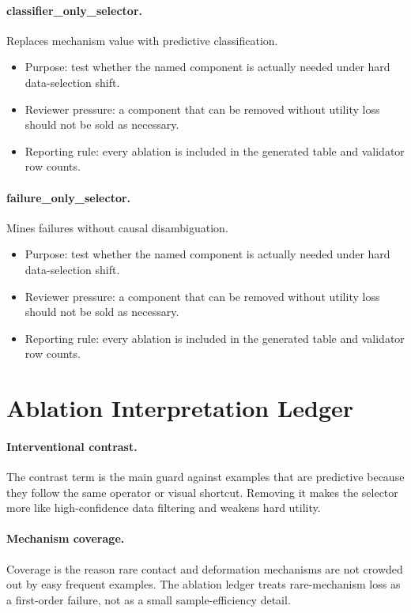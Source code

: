 \documentclass{article}
\begin{document}
\paragraph{classifier\_only\_selector.} Replaces mechanism value with predictive classification.
\begin{itemize}
\item Purpose: test whether the named component is actually needed under hard data-selection shift.
\item Reviewer pressure: a component that can be removed without utility loss should not be sold as necessary.
\item Reporting rule: every ablation is included in the generated table and validator row counts.
\end{itemize}
\paragraph{failure\_only\_selector.} Mines failures without causal disambiguation.
\begin{itemize}
\item Purpose: test whether the named component is actually needed under hard data-selection shift.
\item Reviewer pressure: a component that can be removed without utility loss should not be sold as necessary.
\item Reporting rule: every ablation is included in the generated table and validator row counts.
\end{itemize}
\section{Ablation Interpretation Ledger}
\paragraph{Interventional contrast.} The contrast term is the main guard against examples that are predictive because they follow the same operator or visual shortcut. Removing it makes the selector more like high-confidence data filtering and weakens hard utility.
\paragraph{Mechanism coverage.} Coverage is the reason rare contact and deformation mechanisms are not crowded out by easy frequent examples. The ablation ledger treats rare-mechanism loss as a first-order failure, not as a small sample-efficiency detail.
\end{document}
